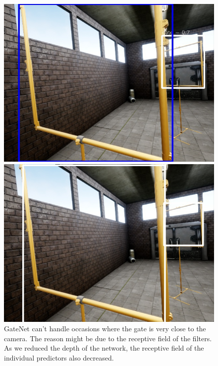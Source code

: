 \documentclass{article}
\begin{document}
\begin{figure}
		\begin{minipage}{0.3\linewidth}
		\includegraphics[width=\linewidth]{fig/gate_comp3}
	\end{minipage}
	\begin{minipage}{0.3\linewidth}
		\includegraphics[width=\linewidth]{fig/v2_comp3}
	\end{minipage}
	\caption{GateNet can't handle occasions where the gate is very close to the camera. The reason might be due to the receptive field of the filters. As we reduced the depth of the network, the receptive field of the individual predictors also decreased.}
	

\end{figure}
\end{document}
